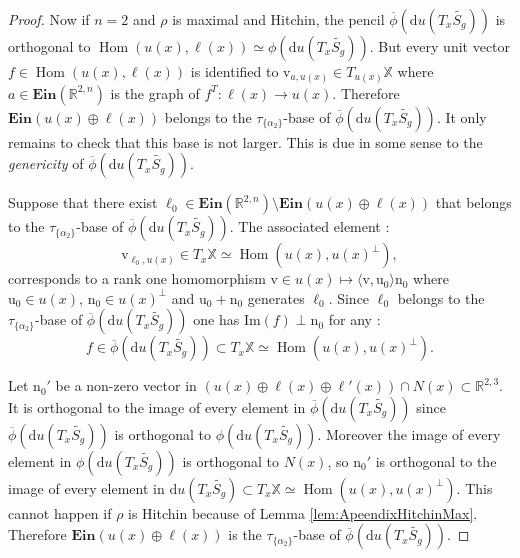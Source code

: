 \documentclass[reqno,10pt]{amsart}
\theoremstyle{plain}
\theoremstyle{definition}
\theoremstyle{remark}
\newcommand{\type}{\tau}
\newcommand{\R}{\mathbb{R}}
\newcommand{\transpose}[1]{\ensuremath{#1^{\scriptscriptstyle T}}}
\DeclareMathOperator{\Hom}{Hom}
\newcommand{\Ein}{\mathbf{Ein}}
\newcommand{\X}{\mathbb{X}}
\begin{document}
\begin{proof}
\medskip

Now if $n=2$ and $\rho$ is maximal and Hitchin, the pencil $\overline{\phi}\left(\mathrm{d}u(T_x\widetilde{S_g})\right)$ is orthogonal to $\Hom\left(u(x),\ell(x)\right)\simeq\phi\left(\mathrm{d}u(T_x\widetilde{S_g})\right)$. But every unit vector $f\in\Hom\left(u(x),\ell(x)\right)$ is identified to $\mathrm{v}_{a,u(x)}\in T_{u(x)}\X$ where $a\in \Ein(\R^{2,n})$ is the graph of $\transpose{f}:\ell(x)\to u(x)$. Therefore $\Ein\left(u(x)\oplus \ell(x)\right)$ belongs to the $\type_{\lbrace \alpha_2\rbrace}$-base of $\overline{\phi}\left(\mathrm{d}u(T_x\widetilde{S_g})\right)$. It only remains to check that this base is not larger. This is due in some sense to the  \emph{genericity} of $\overline{\phi}\left(\mathrm{d}u(T_x\widetilde{S_g})\right)$.

\medskip

Suppose that there exist $\ell_0\in \Ein\left(\R^{2,n}\right)\setminus \Ein\left(u(x)\oplus \ell(x)\right)$ that belongs to the $\type_{\lbrace \alpha_2\rbrace}$-base of $\overline{\phi}\left(\mathrm{d}u(T_x\widetilde{S_g})\right)$. The associated element : 
$$\mathrm{v}_{\ell_0,u(x)}\in T_x\X\simeq \Hom(u(x), u(x)^\perp),$$
corresponds to a rank one  homomorphism $\mathrm{v}\in u(x)\mapsto \langle \mathrm{v},\mathrm{u}_0 \rangle \mathrm{n}_0$ where $\mathrm{u}_0\in u(x)$, $\mathrm{n}_0\in u(x)^\perp$ and $\mathrm{u}_0+\mathrm{n}_0$ generates $\ell_0$. Since $\ell_0$ belongs to the $\type_{\lbrace \alpha_2\rbrace}$-base of $\overline{\phi}\left(\mathrm{d}u(T_x\widetilde{S_g})\right)$ one has $\text{Im}(f)\perp \mathrm{n}_0$ for any : 
$$f\in \overline{\phi}\left(\mathrm{d}u(T_x\widetilde{S_g})\right)\subset T_x\X\simeq \Hom(u(x), u(x)^\perp).$$

\medskip

Let $\mathrm{n}_0'$ be a non-zero vector in $\left(u(x)\oplus \ell(x)\oplus \ell'(x)\right)\cap N(x)\subset \R^{2,3}$. It is orthogonal to the image of every element in $\overline{\phi}\left(\mathrm{d}u(T_x\widetilde{S_g})\right)$ since $\overline{\phi}\left(\mathrm{d}u(T_x\widetilde{S_g})\right)$ is orthogonal to $\phi\left(\mathrm{d}u(T_x\widetilde{S_g})\right)$. Moreover the image of every element in $\phi\left(\mathrm{d}u(T_x\widetilde{S_g})\right)$ is orthogonal to $N(x)$, so $\mathrm{n_0}'$ is orthogonal to the image of every element in $\mathrm{d}u(T_x\widetilde{S_g})\subset T_x\X\simeq \Hom\left(u(x),u(x)^\perp\right)$. This cannot happen if $\rho$ is Hitchin because of Lemma \ref{lem:ApeendixHitchinMax}. Therefore $\Ein\left(u(x)\oplus \ell(x)\right)$ is the $\type_{\lbrace \alpha_2\rbrace}$-base of $\overline{\phi}\left(\mathrm{d}u(T_x\widetilde{S_g})\right)$.

\end{proof}
\end{document}

